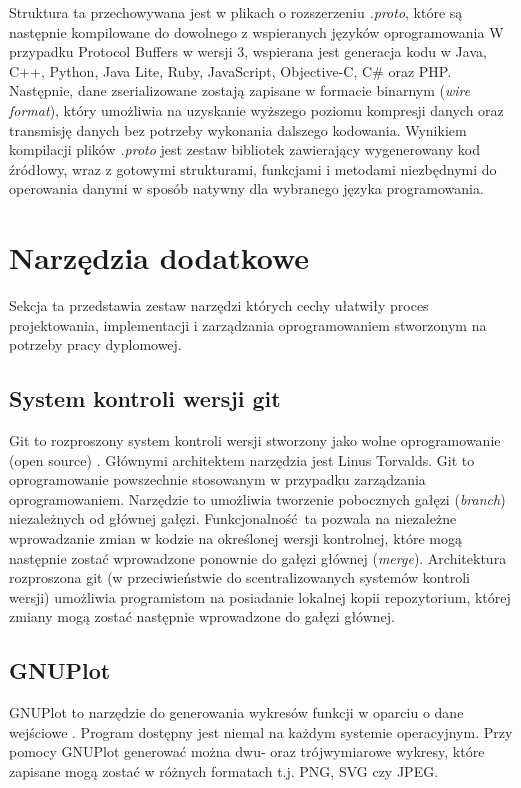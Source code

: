 \documentclass[a4paper,12pt,twoside,openany]{report}
\begin{document}
Struktura ta przechowywana jest w plikach o rozszerzeniu \textit{.proto}, które są następnie kompilowane do dowolnego z wspieranych języków oprogramowania 
W przypadku Protocol Buffers w wersji 3, wspierana jest generacja kodu w Java, C++, Python, Java Lite, Ruby, JavaScript, Objective-C, C\# oraz PHP.
Następnie, dane zserializowane zostają zapisane w formacie binarnym (\textit{wire format}), który umożliwia na uzyskanie wyższego poziomu kompresji danych oraz transmisję danych 
bez potrzeby wykonania dalszego kodowania. 
Wynikiem kompilacji plików \textit{.proto} jest zestaw bibliotek zawierający wygenerowany kod źródłowy, wraz z gotowymi strukturami, funkcjami i metodami niezbędnymi do 
operowania danymi w sposób natywny dla wybranego języka programowania.

\section{Narzędzia dodatkowe}

Sekcja ta przedstawia zestaw narzędzi których cechy ułatwiły proces projektowania, implementacji i zarządzania oprogramowaniem stworzonym na potrzeby
pracy dyplomowej.

\subsection{System kontroli wersji git}
Git to rozproszony system kontroli wersji stworzony jako wolne oprogramowanie (open source) \cite{gitBook}. 
Głównymi architektem narzędzia jest Linus Torvalds. Git to oprogramowanie powszechnie stosowanym w przypadku zarządzania oprogramowaniem.
Narzędzie to umożliwia tworzenie pobocznych gałęzi (\textit{branch}) niezależnych od głównej gałęzi. Funkcjonalność ta pozwala na niezależne wprowadzanie zmian
w kodzie na określonej wersji kontrolnej, które mogą następnie zostać wprowadzone ponownie do gałęzi głównej (\textit{merge}).
Architektura rozproszona git (w przeciwieństwie do scentralizowanych systemów kontroli wersji) umożliwia programistom na posiadanie lokalnej kopii repozytorium,
której zmiany mogą zostać następnie wprowadzone do gałęzi głównej.

\subsection{GNUPlot}

GNUPlot to narzędzie do generowania wykresów funkcji w oparciu o dane wejściowe \cite{gnuplotBook}. Program dostępny jest niemal na każdym systemie operacyjnym.
Przy pomocy GNUPlot generować można dwu- oraz trójwymiarowe wykresy, które zapisane mogą zostać w różnych formatach t.j. PNG, SVG czy JPEG.
\end{document}
